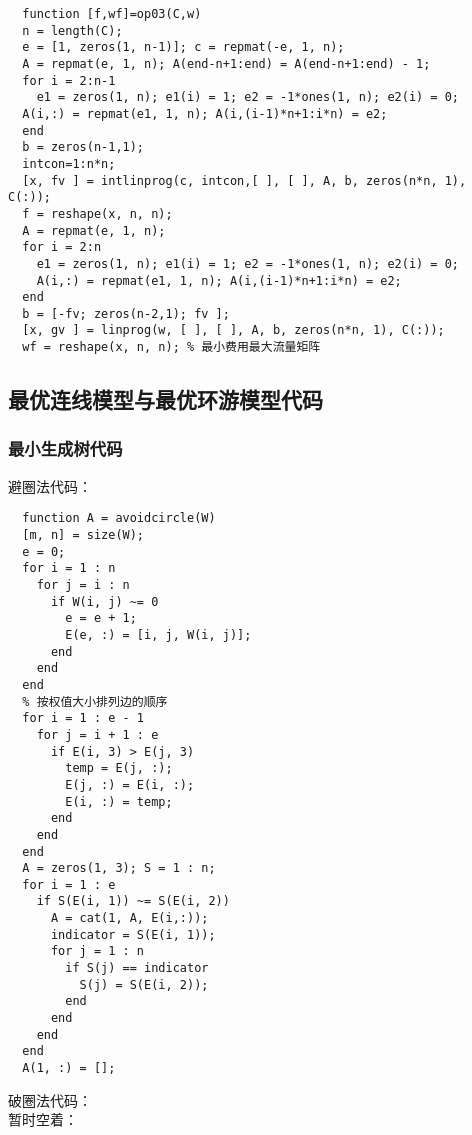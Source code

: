 \begin{lstlisting}
  function [f,wf]=op03(C,w)
  n = length(C);
  e = [1, zeros(1, n-1)]; c = repmat(-e, 1, n);
  A = repmat(e, 1, n); A(end-n+1:end) = A(end-n+1:end) - 1;
  for i = 2:n-1
    e1 = zeros(1, n); e1(i) = 1; e2 = -1*ones(1, n); e2(i) = 0;
  A(i,:) = repmat(e1, 1, n); A(i,(i-1)*n+1:i*n) = e2; 
  end
  b = zeros(n-1,1);
  intcon=1:n*n;
  [x, fv ] = intlinprog(c, intcon,[ ], [ ], A, b, zeros(n*n, 1), C(:));
  f = reshape(x, n, n);
  A = repmat(e, 1, n);
  for i = 2:n
    e1 = zeros(1, n); e1(i) = 1; e2 = -1*ones(1, n); e2(i) = 0;
    A(i,:) = repmat(e1, 1, n); A(i,(i-1)*n+1:i*n) = e2; 
  end
  b = [-fv; zeros(n-2,1); fv ];
  [x, gv ] = linprog(w, [ ], [ ], A, b, zeros(n*n, 1), C(:));
  wf = reshape(x, n, n); % 最小费用最大流量矩阵
\end{lstlisting}
\subsection{最优连线模型与最优环游模型代码}
\subsubsection{最小生成树代码}
\noindent 避圈法代码：
\begin{lstlisting}
  function A = avoidcircle(W)
  [m, n] = size(W);
  e = 0;
  for i = 1 : n
    for j = i : n
      if W(i, j) ~= 0
        e = e + 1;
        E(e, :) = [i, j, W(i, j)];
      end
    end
  end
  % 按权值大小排列边的顺序
  for i = 1 : e - 1
    for j = i + 1 : e
      if E(i, 3) > E(j, 3)
        temp = E(j, :);
        E(j, :) = E(i, :);
        E(i, :) = temp;
      end
    end
  end
  A = zeros(1, 3); S = 1 : n;
  for i = 1 : e
    if S(E(i, 1)) ~= S(E(i, 2))
      A = cat(1, A, E(i,:));
      indicator = S(E(i, 1));
      for j = 1 : n
        if S(j) == indicator
          S(j) = S(E(i, 2));
        end
      end
    end
  end
  A(1, :) = [];
\end{lstlisting}
破圈法代码：\\
暂时空着：
\begin{lstlisting}
\end{lstlisting}
